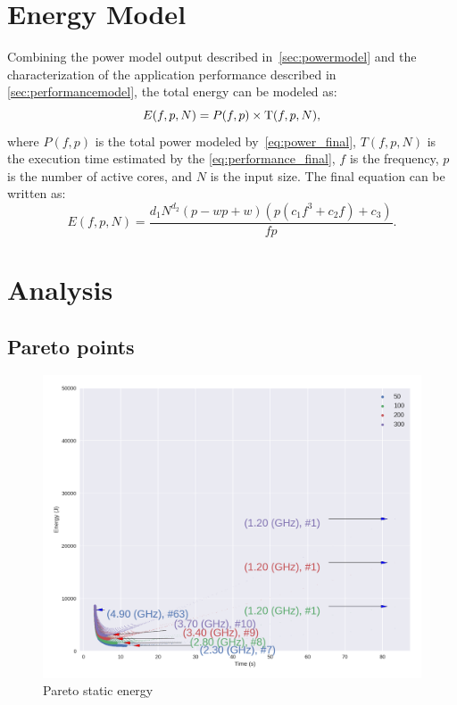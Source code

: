 \section{Energy Model} \label{sec:energymodel}
Combining the power model output described in~\cref{sec:powermodel} and the characterization of the application performance described in \cref{sec:performancemodel}, the total energy can be modeled as:
\begin{equation}
E(f,p,N)=P(f,p)\times{\rm T}(f,p,N),
\label{eq:en_combination}
\end{equation}
where $P(f,p)$ is the total power modeled by~\cref{eq:power_final}, ${T}(f,p,N)$ is the execution time estimated by the \cref{eq:performance_final}, $f$ is the frequency, $p$ is the number of active cores, and $N$ is the input size. The final equation can be written as:
\begin{equation}
E(f,p,N)=\frac{d_1N^{d_2}(p-wp+w)(p(c_1f^3+c_2f)+c_3)}{fp}.
\label{eq:en_final}
\end{equation}



\section{Analysis}


\subsection{Pareto points}


\begin{figure}

	\centering

	\includegraphics[width=\columnwidth]{models/figures/analisys/pareto_static_high.png}

	\caption{Pareto static energy}

	\label{fig:pareto_static_h}

\end{figure}



